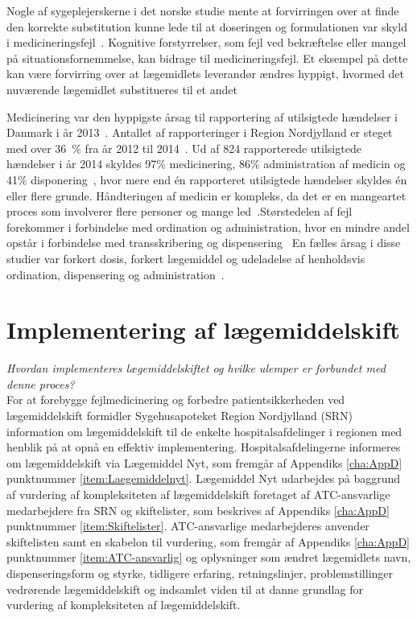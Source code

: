 Nogle af sygeplejerskerne i det norske studie mente at forvirringen over at finde den korrekte substitution kunne lede til at doseringen og formulationen var skyld i medicineringsfejl~\citep{Hakonsen2010}. Kognitive forstyrrelser, som fejl ved bekræftelse eller mangel på situationsfornemmelse, kan bidrage til medicineringsfejl. Et eksempel på dette kan være forvirring over at lægemidlets leverandør ændres hyppigt, hvormed det nuværende lægemidlet substitueres til et andet~\citep{Wittich2014}

Medicinering var den hyppigste årsag til rapportering af utilsigtede hændelser i Danmark i år 2013~\citep{Patientombuddet2013}. Antallet af rapporteringer i Region Nordjylland er steget med over 36~\% fra år 2012 til 2014~\citep{Jensen2014}. Ud af 824 rapporterede utilsigtede hændelser i år 2014 skyldes 97\% medicinering, 86\% administration af medicin og 41\% disponering~\citep{Jensen2014}, hvor mere end én rapporteret utilsigtede hændelser skyldes én eller flere grunde.  Håndteringen af medicin er kompleks, da det er en mangeartet proces som involverer flere personer og mange led~\citep{Barker2002,Sundhedsstyrelsen2005,Lisby2005, Tully2009}.Størstedelen af fejl forekommer i forbindelse med ordination og administration, hvor en mindre andel opstår i forbindelse med transskribering og dispensering~\citep{Agrawal2009, Anderson2002} En fælles årsag i disse studier var forkert dosis, forkert lægemiddel og udeladelse af henholdsvis ordination, dispensering og administration~\citep{Barker2002,Sundhedsstyrelsen2005,Lisby2005, Tully2009}.

\section{Implementering af lægemiddelskift} \label{sec:ImpLaeg}
\textit{Hvordan implementeres lægemiddelskiftet og hvilke ulemper er forbundet med denne proces?} \\
For at forebygge fejlmedicinering og forbedre patientsikkerheden ved lægemiddelskift formidler Sygehusapoteket Region Nordjylland (SRN) information om lægemiddelskift til de enkelte hospitalsafdelinger i regionen med henblik på at opnå en effektiv implementering. Hospitalsafdelingerne informeres om lægemiddelskift via Lægemiddel Nyt, som fremgår af Appendiks \ref{cha:AppD} punktnummer \ref{item:Laegemiddelnyt}. Lægemiddel Nyt udarbejdes på baggrund af vurdering af kompleksiteten af lægemiddelskift foretaget af ATC-ansvarlige medarbejdere fra SRN og skiftelister, som beskrives af Appendiks \ref{cha:AppD} punktnummer \ref{item:Skiftelister}. ATC-ansvarlige medarbejderes anvender skiftelisten samt en skabelon til vurdering, som fremgår af Appendiks \ref{cha:AppD} punktnummer \ref{item:ATC-ansvarlig} og oplysninger som ændret lægemidlets navn, dispenseringsform og styrke, tidligere erfaring, retningslinjer, problemstillinger vedrørende lægemiddelskift og indsamlet viden til at danne grundlag for vurdering af kompleksiteten af lægemiddelskift.

